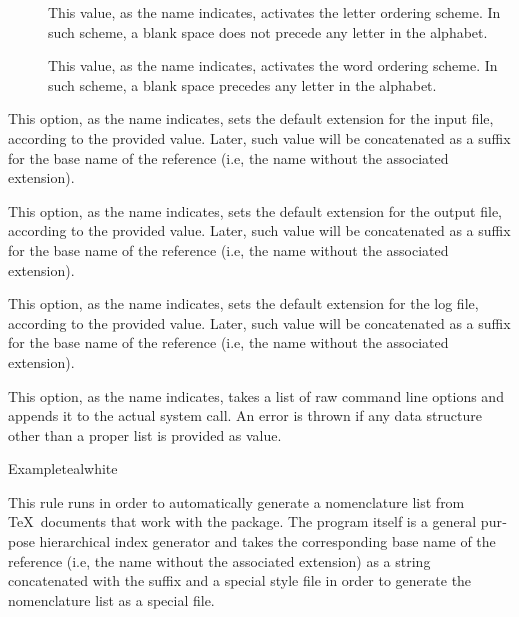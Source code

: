 \begin{description}
\begin{description}
\begin{description}
\item[] This value, as the name indicates, activates the letter ordering scheme. In such scheme, a blank space does not precede any letter in the alphabet. 

\item[] This value, as the name indicates, activates the word ordering scheme. In such scheme, a blank space precedes any letter in the alphabet.
\end{description}

\item[\rpbox{input}{idx}] This option, as the name indicates, sets the default extension for the input file, according to the provided value. Later, such value will be concatenated as a suffix for the base name of the  reference (i.e, the name without the associated extension).

\item[\rpbox{output}{ind}] This option, as the name indicates, sets the default extension for the output file, according to the provided value. Later, such value will be concatenated as a suffix for the base name of the  reference (i.e, the name without the associated extension).

\item[\rpbox{log}{ilg}] This option, as the name indicates, sets the default extension for the log file, according to the provided value. Later, such value will be concatenated as a suffix for the base name of the  reference (i.e, the name without the associated extension).

\item[\abox{options}] This option, as the name indicates, takes a list of raw command line options and appends it to the actual system call. An error is thrown if any data structure other than a proper list is provided as value.
\end{description}

\begin{codebox}{Example}{teal}{\icnote}{white}
\end{codebox}

\item[\rulebox{nomencl}{Marco Daniel, Nicola Talbot, Paulo Cereda}] This rule runs  in order to automatically generate a nomenclature list from \TeX\ documents that work with the  package. The program itself is a gen­eral pur­pose hi­er­ar­chical in­dex gen­er­a­tor and takes the corresponding base name of the  reference (i.e, the name without the associated extension) as a string concatenated with the  suffix and a special style file in order to generate the nomenclature list as a special  file.


\end{description}
